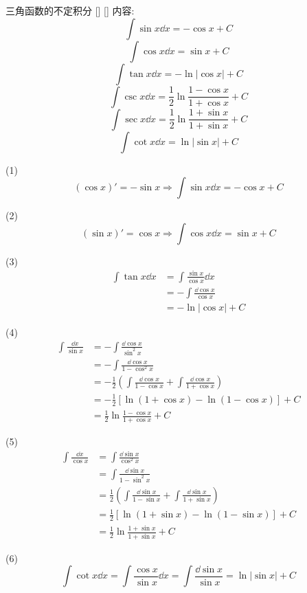 \documentclass[UTF8]{ctexart}
\begin{document}
			\begin{xmp}
			    []
			    {三角函数的不定积分}
			    []
			    []
				内容: 
				\[\int\sin x\dd x=-\cos x+C\]
				\[\int\cos x\dd x=\sin x+C\]
				\[\int\tan x\dd x=-\ln|\cos x|+C\]
				\[\int\csc x\dd x=\frac{1}{2}\ln\frac{1-\cos x}{1+\cos x}+C\]
				\[\int\sec x\dd x=\frac{1}{2}\ln\frac{1+\sin x}{1+\sin x}+C\]
				\[\int\cot x\dd x=\ln|\sin x|+C\]
			\end{xmp}
				
			\begin{prf}
				(1)\[(\cos x)'=-\sin x\Longrightarrow\int\sin x\dd x=-\cos x+C\]
				
				(2)\[(\sin x)'=\cos x\Longrightarrow\int\cos x\dd x=\sin x+C\]
				
				(3)\[
				\begin{aligned}
					\int\tan x\dd x
					& = \int\frac{\sin x}{\cos x}\dd x\\
					& = -\int\frac{\dd\cos x}{\cos x}\\
					& = -\ln|\cos x|+C
				\end{aligned}\]
				
				(4)\[
				\begin{aligned}
					\int\frac{\dd x}{\sin x}
					& = -\int\frac{\dd\cos x}{\sin^2x}\\
					& = -\int\frac{\dd\cos x}{1-\cos^2x}\\
					& = -\frac{1}{2}\left(\int\frac{\dd\cos x}{1-\cos x}+\int\frac{\dd\cos x}{1+\cos x}\right)\\
					& = -\frac{1}{2}[\ln(1+\cos x)-\ln(1-\cos x)]+C\\
					& = \frac{1}{2}\ln\frac{1-\cos x}{1+\cos x}+C
				\end{aligned}\]
				
				(5)\[
				\begin{aligned}
					\int\frac{\dd x}{\cos x}
					& = \int\frac{\dd\sin x}{\cos^2x}\\
					& = \int\frac{\dd\sin x}{1-\sin^2x}\\
					& = \frac{1}{2}\left(\int\frac{\dd\sin x}{1-\sin x}+\int\frac{\dd\sin x}{1+\sin x}\right)\\
					& = \frac{1}{2}[\ln(1+\sin x)-\ln(1-\sin x)]+C\\
					& = \frac{1}{2}\ln\frac{1+\sin x}{1+\sin x}+C
				\end{aligned}\]
				
				(6)\[\int\cot x\dd x=\int\frac{\cos x}{\sin x}\dd x=\int\frac{\dd\sin x}{\sin x}=\ln|\sin x|+C\]
                \end{prf}
			
\end{document}
